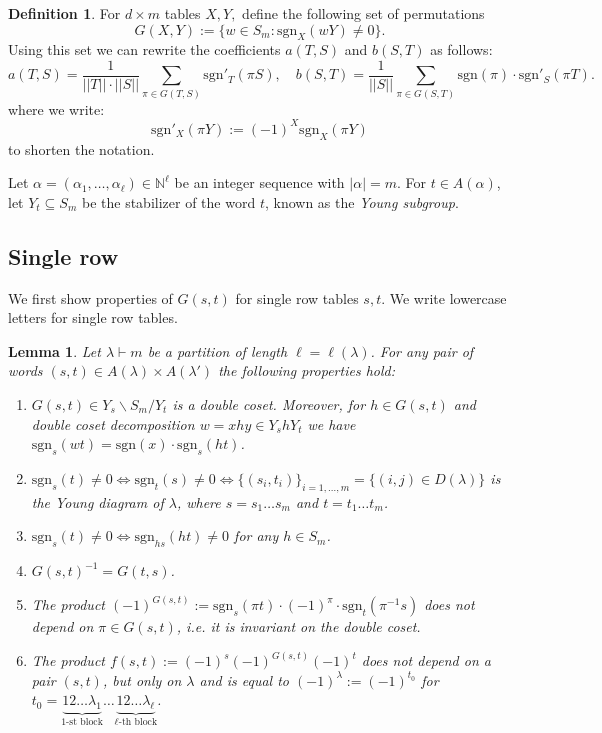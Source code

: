 \documentclass[12pt, reqno]{amsart}
\newtheorem{lemma}[theorem]{Lemma}
\theoremstyle{definition}
\newtheorem{definition}[theorem]{Definition}
\newcommand{\sgn}{\mathrm{sgn}}
\begin{document}
\begin{definition}
    For $d \times m$ tables $X, Y,$ %
    define the following set of permutations
    $$
        G(X,Y) := \{ w \in S_m: \sgn_X(w Y) \neq 0 \}. %
    $$
    Using this set we can rewrite the coefficients $a(T,S)$ and $b(S,T)$ as follows:
    \begin{equation}\label{eq:ats-bst}
        a(T,S) = \frac{1}{||T||\cdot||S||} \sum_{\pi \in G(T,S)} \sgn'_T(\pi S),\quad
        b(S,T) = \frac{1}{||S||}\sum_{\pi \in G(S,T)} \sgn(\pi) \cdot \sgn'_S(\pi T).
    \end{equation}
    where we write:
    $$
        \sgn'_X(\pi Y) := (-1)^X \sgn_X(\pi Y)
    $$
    to shorten the notation. 
    \end{definition}

    Let $\alpha = (\alpha_1,\ldots,\alpha_\ell) \in \mathbb{N}^\ell$ be an integer sequence with $|\alpha| = m$. For $t \in A(\alpha)$, let $Y_{t} \subseteq S_m$ be the stabilizer of the word $t$, known as the \textit{Young subgroup}.
    

\subsection{Single row}
We first show properties of $G(s,t)$ for single row tables $s, t$. We write lowercase letters for single row tables. 

\begin{lemma}\label{lemma:gst}
    Let $\lambda\vdash m$ be a partition of length $\ell = \ell(\lambda)$. For any pair of words $(s,t) \in A(\lambda) \times A(\lambda')$ the following properties hold:
    \begin{enumerate}[label=(\alph*)]
        \item  $G(s,t) \in Y_{s} \backslash S_m / Y_{t}$ is a double coset. Moreover, for $h \in G(s,t)$ and double coset decomposition $w = xhy \in Y_s h Y_t$ we have $\sgn_s(wt) = \sgn(x)\cdot \sgn_s(ht)$.
        \item $\sgn_s(t) \neq 0 \iff \sgn_t(s) \neq 0 \iff \{(s_i, t_i)\}_{i=1,\ldots,m} = \{(i,j) \in D(\lambda) \}$ is the Young diagram of $\lambda$, where $s = s_1\ldots s_m$ and $t = t_1 \ldots t_m$. 
        \item $\sgn_{s}(t) \neq 0 \iff \sgn_{hs}(ht) \neq 0$ for any $h\in S_m$.
        \item $G(s,t)^{-1} = G(t,s)$.
        \item The product $(-1)^{G(s,t)} := \sgn_s(\pi t) \cdot (-1)^{\pi} \cdot \sgn_{t}(\pi^{-1}s)$ does not depend on $\pi \in G(s,t)$, i.e. it is invariant on the double coset.
        \item The product $f(s,t) := (-1)^s(-1)^{G(s,t)}(-1)^t$
        does not depend on a pair $(s,t)$, but only on $\lambda$ and is equal to $(-1)^{\lambda} := (-1)^{t_0}$ for $t_0 = \underbrace{12\ldots \lambda_1}_{1\text{-st block}}\ldots \underbrace{12\ldots\lambda_{\ell}}_{\ell\text{-th block}}$.
    \end{enumerate}
\end{lemma}
\end{document}
